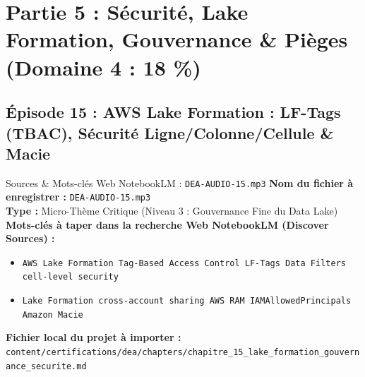 \documentclass[11pt,a4paper]{article}
\begin{document}
\newpage

\section{Partie 5 : Sécurité, Lake Formation, Gouvernance \& Pièges (Domaine 4 : 18 \%)}

\subsection{Épisode 15 : AWS Lake Formation : LF-Tags (TBAC), Sécurité Ligne/Colonne/Cellule \& Macie}
\begin{sourcebox}{Sources \& Mots-clés Web NotebookLM : \texttt{DEA-AUDIO-15.mp3}}
\textbf{Nom du fichier à enregistrer :} \texttt{DEA-AUDIO-15.mp3}\\
\textbf{Type :} Micro-Thème Critique (Niveau 3 : Gouvernance Fine du Data Lake)\\
\textbf{Mots-clés à taper dans la recherche Web NotebookLM (Discover Sources) :}
\begin{itemize}[noitemsep]
    \item \texttt{AWS Lake Formation Tag-Based Access Control LF-Tags Data Filters cell-level security}
    \item \texttt{Lake Formation cross-account sharing AWS RAM IAMAllowedPrincipals Amazon Macie}
\end{itemize}
\textbf{Fichier local du projet à importer :}
\texttt{content/certifications/dea/chapters/chapitre_15_lake_formation_gouvernance_securite.md}
\end{sourcebox}
\end{document}
